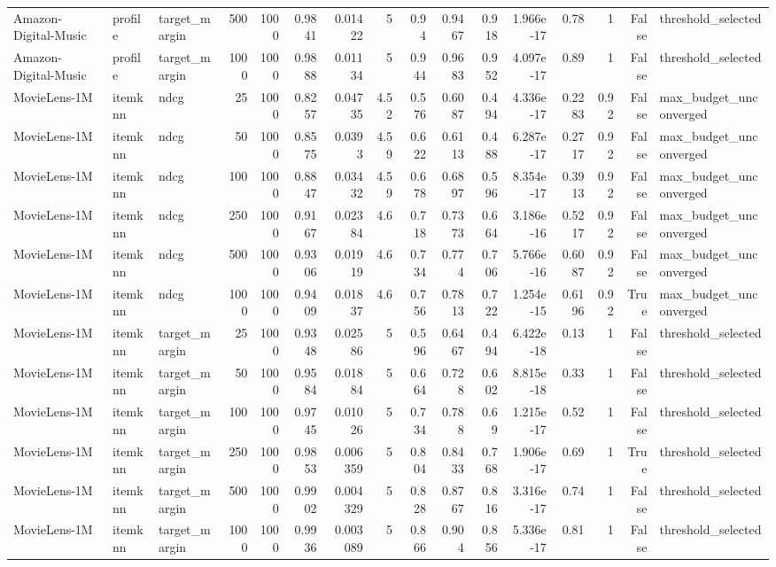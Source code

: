 \begin{table}[t]
{\begin{tabular}{lllrrrrrrrrrrrrl}
Amazon-Digital-Music & profile & target\_margin & 500 & 1000 & 0.9841 & 0.01422 & 5 & 0.94 & 0.9467 & 0.918 & 1.966e-17 & 0.78 & 1 & False & threshold\_selected \\
Amazon-Digital-Music & profile & target\_margin & 1000 & 1000 & 0.9888 & 0.01134 & 5 & 0.944 & 0.9683 & 0.952 & 4.097e-17 & 0.89 & 1 & False & threshold\_selected \\
MovieLens-1M & itemknn & ndcg & 25 & 1000 & 0.8257 & 0.04735 & 4.52 & 0.576 & 0.6087 & 0.494 & 4.336e-17 & 0.2283 & 0.92 & False & max\_budget\_unconverged \\
MovieLens-1M & itemknn & ndcg & 50 & 1000 & 0.8575 & 0.0393 & 4.59 & 0.622 & 0.6113 & 0.488 & 6.287e-17 & 0.2717 & 0.92 & False & max\_budget\_unconverged \\
MovieLens-1M & itemknn & ndcg & 100 & 1000 & 0.8847 & 0.03432 & 4.59 & 0.678 & 0.6897 & 0.596 & 8.354e-17 & 0.3913 & 0.92 & False & max\_budget\_unconverged \\
MovieLens-1M & itemknn & ndcg & 250 & 1000 & 0.9167 & 0.02384 & 4.6 & 0.718 & 0.7373 & 0.664 & 3.186e-16 & 0.5217 & 0.92 & False & max\_budget\_unconverged \\
MovieLens-1M & itemknn & ndcg & 500 & 1000 & 0.9306 & 0.01919 & 4.6 & 0.734 & 0.774 & 0.706 & 5.766e-16 & 0.6087 & 0.92 & False & max\_budget\_unconverged \\
MovieLens-1M & itemknn & ndcg & 1000 & 1000 & 0.9409 & 0.01837 & 4.6 & 0.756 & 0.7813 & 0.722 & 1.254e-15 & 0.6196 & 0.92 & True & max\_budget\_unconverged \\
MovieLens-1M & itemknn & target\_margin & 25 & 1000 & 0.9348 & 0.02586 & 5 & 0.596 & 0.6467 & 0.494 & 6.422e-18 & 0.13 & 1 & False & threshold\_selected \\
MovieLens-1M & itemknn & target\_margin & 50 & 1000 & 0.9584 & 0.01884 & 5 & 0.664 & 0.728 & 0.602 & 8.815e-18 & 0.33 & 1 & False & threshold\_selected \\
MovieLens-1M & itemknn & target\_margin & 100 & 1000 & 0.9745 & 0.01026 & 5 & 0.734 & 0.788 & 0.69 & 1.215e-17 & 0.52 & 1 & False & threshold\_selected \\
MovieLens-1M & itemknn & target\_margin & 250 & 1000 & 0.9853 & 0.006359 & 5 & 0.804 & 0.8433 & 0.768 & 1.906e-17 & 0.69 & 1 & True & threshold\_selected \\
MovieLens-1M & itemknn & target\_margin & 500 & 1000 & 0.9902 & 0.004329 & 5 & 0.828 & 0.8767 & 0.816 & 3.316e-17 & 0.74 & 1 & False & threshold\_selected \\
MovieLens-1M & itemknn & target\_margin & 1000 & 1000 & 0.9936 & 0.003089 & 5 & 0.866 & 0.904 & 0.856 & 5.336e-17 & 0.81 & 1 & False & threshold\_selected \\

\end{tabular}}
\end{table}

